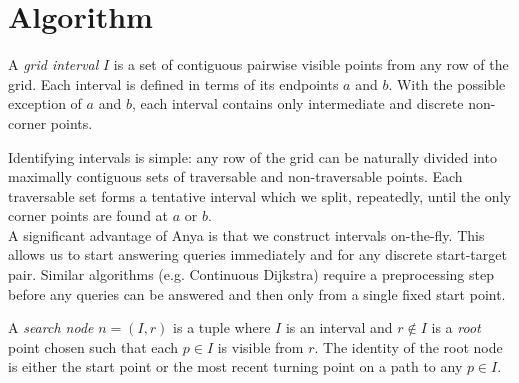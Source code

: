 \section{Algorithm}

\begin{defi}
\label{defi::interval}
A \emph{grid interval} $I$ is a set of contiguous pairwise visible points 
from any row of the grid.  Each interval is defined in terms 
of its endpoints $a$ and $b$. 
With the possible exception of $a$ and $b$, each interval
contains only intermediate and discrete non-corner points.
\end{defi}
Identifying intervals is simple: any row of the grid can be naturally divided
into maximally contiguous sets of traversable and non-traversable points.
Each traversable set forms a tentative interval which we split, repeatedly,
until the only corner points are found at $a$ or $b$.
\\
A significant advantage of Anya is that we construct intervals on-the-fly.
This allows us to start answering queries immediately and for any discrete
start-target pair. Similar algorithms (e.g. Continuous Dijkstra) require
a preprocessing step before any queries can be answered and then only
from a single fixed start point. 
\begin{defi}
\label{defi:searchnode}
A \emph{search node} $n = (I, r)$ is a tuple where $I$ is an interval and 
$r \not \in I$ is a \emph{root} point chosen such that each $p \in I$  
is visible from $r$. 
The identity of the root node is either the start point or the most recent
turning point on a path to any $p \in I$.
\end{defi}
